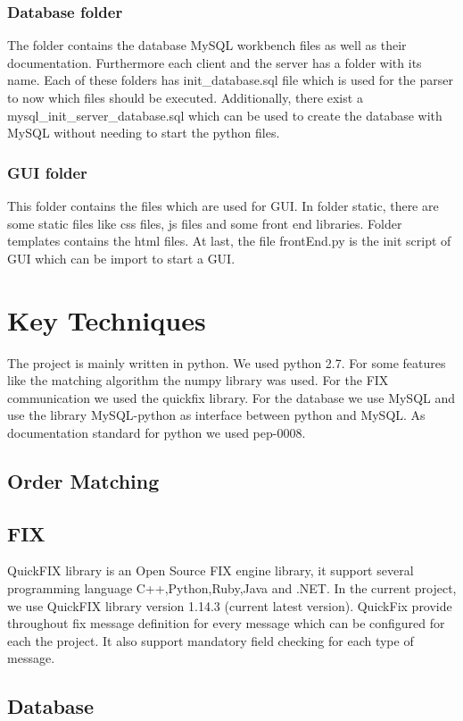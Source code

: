 \documentclass[a4paper, 11pt]{article}
\begin{document}
\subsubsection*{Database folder} 
The folder contains the database MySQL workbench files as well as their documentation. Furthermore each client and the server has
a folder with its name. Each of these folders has init\_database.sql file which is used for the parser to now which files should be
executed. Additionally, there exist a mysql\_init\_server\_database.sql which can be used to create the database with MySQL without
needing to start the python files.

\subsubsection*{GUI folder}
This folder contains the files which are used for GUI. In folder static, there are some static files like css files, js files
and some front end libraries. Folder templates contains the html files. At last, the file frontEnd.py is the init script of GUI which can be import to start a GUI. 


\section*{Key Techniques}

The project is mainly written in python. We used python 2.7. For some features like the matching algorithm the numpy library \cite{numpy} was used.
For the FIX communication we used the quickfix library. For the database we use MySQL and use the library MySQL-python as interface between python and MySQL.
As documentation standard for python we used pep-0008.
\subsection*{Order Matching}

\subsection*{FIX}
QuickFIX library is an Open Source FIX engine library, it support several programming language C++,Python,Ruby,Java and .NET. 
In the current project, we use QuickFIX library version 1.14.3 (current latest version). QuickFix provide throughout fix message definition for every message which can be configured for each the project.
It also support mandatory field checking for each type of message.
\subsection*{Database}
\end{document}
